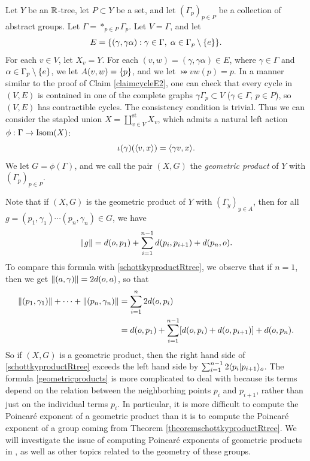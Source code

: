 \begin{example}
\label{examplegeometricproducts}
Let $Y$ be an $\R$-tree, let $P\subset Y$ be a set, and let $(\Gamma_p)_{p\in P}$ be a collection of abstract groups. Let $\Gamma = \ast_{p\in P} \Gamma_p$. Let $V = \Gamma$, and let
\[
E = \{(\gamma,\gamma\alpha) : \gamma\in \Gamma , \; \alpha\in \Gamma_p\setminus\{e\}\}.
\]
For each $v\in V$, let $X_v = Y$. For each $(v,w) = (\gamma,\gamma\alpha)\in E$, where $\gamma\in\Gamma$ and $\alpha\in \Gamma_p\setminus\{e\}$, we let $A(v,w) = \{p\}$, and we let $\bij vw(p) = p$. In a manner similar to the proof of Claim \ref{claimcycleE2}, one can check that every cycle in $(V,E)$ is contained in one of the complete graphs $\gamma\Gamma_p \subset V$ ($\gamma\in\Gamma$, $p\in P$), so $(V,E)$ has contractible cycles. The consistency condition is trivial. Thus we can consider the stapled union $X = \coprod_{v\in V}^{\text{st}} X_v$, which admits a natural left action $\phi:\Gamma\to\operatorname{Isom}(X)$:
\[
\iota(\gamma)(\langle v,x\rangle) = \langle\gamma v,x\rangle.
\]
We let $G = \phi(\Gamma)$, and we call the pair $(X,G)$ the \emph{geometric product} of $Y$ with $(\Gamma_p)_{p\in P}$.
\end{example}

Note that if $(X,G)$ is the geometric product of $Y$ with $(\Gamma_y)_{y\in A}$, then for all $g = (p_1,\gamma_1)\cdots (p_n,\gamma_n)\in G$, we have
\begin{equation}
\label{geometricproducts}
\|g\| = d(o,p_1) + \sum_{i = 1}^{n - 1} d(p_i,p_{i + 1}) + d(p_n,o).
\end{equation}
To compare this formula with \eqref{schottkyproductRtree}, we observe that if $n = 1$, then we get $\|(a,\gamma)\| = 2d(o,a)$, so that
\begin{align*}
\|(p_1,\gamma_1)\| + \cdots + \|(p_n,\gamma_n)\| &= \sum_{i = 1}^n 2d(o,p_i)\\
& = d(o,p_1) + \sum_{i = 1}^{n - 1} [d(o,p_i) + d(o,p_{i + 1})] + d(o,p_n).
\end{align*}
So if $(X,G)$ is a geometric product, then the right hand side of \eqref{schottkyproductRtree} exceeds the left hand side by $\sum_{i = 1}^{n - 1} 2\langle p_i|p_{i + 1}\rangle_o$. The formula \eqref{geometricproducts} is more complicated to deal with because its terms depend on the relation between the neighborhing points $p_i$ and $p_{i + 1}$, rather than just on the individual terms $p_i$. In particular, it is more difficult to compute the Poincar\'e exponent of a geometric product than it is to compute the Poincar\'e exponent of a group coming from Theorem \ref{theoremschottkyproductRtree}. We will investigate the issue of computing Poincar\'e exponents of geometric products in \cite{DSU2}, as well as other topics related to the geometry of these groups.

